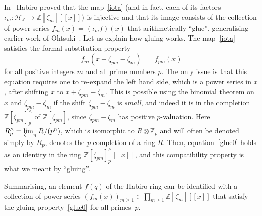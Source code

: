 \documentclass[12pt,reqno]{amsart}
\theoremstyle{definition}
\def\BZ{\mathbb Z}
\def\calH{\mathcal H}
\def\be{\begin{equation}}
\def\ee{\end{equation}}
\def\z{\zeta}
\def\={\;=\;}
\begin{document}
In~\cite{Habiro:completion} Habiro proved that the map~\eqref{iota} (and in fact,
each of its factors $\iota_m:\calH_\BZ\rightarrow\BZ[\z_m][\![x]\!]$)
is injective and that its image consists of the collection of power series
$f_m(x)=(\iota_m f)(x)$ that arithmetically ``glue'', generalising earlier
work of Ohtsuki~\cite{Ohtsuki:poly}. Let us explain how gluing works. 
The map~\eqref{iota} satisfies the formal substitution property
\be
\label{glue0}
f_m(x + \z_{pm} - \z_m) \= f_{pm}(x) 
\ee
for all positive integers $m$ and all prime numbers $p$. The only issue is that this
equation requires one to re-expand the left hand side, which is a power series in $x$,
after shifting $x$ to $x + \z_{pm} -\z_m$. This is possible using the binomial
theorem on $x$ and $\z_{pm}-\z_m$ if the shift
$\z_{pm} -\z_m$ is \emph{small}, and indeed it is in the completion
$\BZ[\z_{pm}]^\wedge_p$ of $\BZ[\z_{pm}]$, since $\z_{pm} -\z_m$ has positive
$p$-valuation. 
Here $R^{\wedge}_p=\varprojlim_n R/(p^n)$, which is isomorphic to $R\otimes \BZ_p$ and
will often be denoted simply by $R_p$, denotes the $p$-completion
of a ring $R$. Then, equation~\eqref{glue0} holds as an identity in the ring
$\BZ[\z_{pm}]^\wedge_p[\![x]\!]$, and this compatibility property is what we meant
by ``gluing''.

Summarising, an element $f(q)$ of the Habiro ring can be identified with a
collection of power series $(f_m(x))_{m \geq 1} \in \prod_{m \geq 1} \BZ[\z_m][\![x]\!]$
that satisfy the gluing property~\eqref{glue0} for all primes~$p$.
\end{document}
